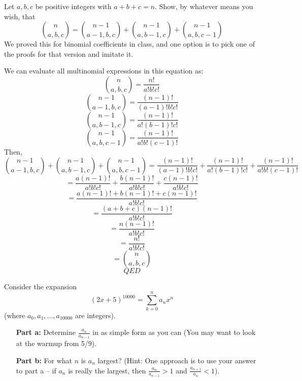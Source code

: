 \documentclass[11pt]{amsart}
\begin{document}
\begin{problem}

Let $a,b,c$ be positive integers with $a+b+c=n$.  Show, by whatever means you wish, that 
$$\binom{n}{a,b,c} = \binom{n-1}{a-1,b,c}+\binom{n-1}{a,b-1,c}+\binom{n-1}{a,b,c-1}$$
We proved this for binomial coefficients in class, and one option is to pick one of the proofs for that version and imitate it. 
\end{problem}
\begin{solution}

We can evaluate all multinomial expressions in this equation as:
$$\binom{n}{a,b,c} = \frac{n!}{a!b!c!}$$
$$\binom{n-1}{a-1,b,c} = \frac{(n-1)!}{(a-1)!b!c!}$$
$$\binom{n-1}{a,b-1,c} = \frac{(n-1)!}{a!(b-1)!c!}$$
$$\binom{n-1}{a,b,c-1} = \frac{(n-1)!}{a!b!(c-1)!}$$
Then,
$$\binom{n-1}{a-1,b,c} + \binom{n-1}{a,b-1,c} + \binom{n-1}{a,b,c-1} = \frac{(n-1)!}{(a-1)!b!c!} + \frac{(n-1)!}{a!(b-1)!c!} + \frac{(n-1)!}{a!b!(c-1)!}$$
$$= \frac{a(n-1)!}{a!b!c!} + \frac{b(n-1)!}{a!b!c!} + \frac{c(n-1)!}{a!b!c!}$$
$$= \frac{a(n-1)!+b(n-1)!+c(n-1)!}{a!b!c!}$$
$$= \frac{(a+b+c)(n-1)!}{a!b!c!}$$
$$= \frac{n(n-1)!}{a!b!c!}$$
$$= \frac{n!}{a!b!c!}$$
$$ = \binom{n}{a,b,c}$$
$$QED$$
\end{solution}
 
 
\begin{problem}

Consider the expansion 
$$(2x+5)^{10000} = \sum_{k=0}^n a_n x^n$$
(where $a_0, a_1, \dots, a_{10000}$ are integers).
\begin{itemize}
	\item[\textbf{Part a:}]{} Determine $\frac{a_n}{a_{n-1}}$ in as simple form as you can (You may want to look at the warmup from 5/9).
	\item[\textbf{Part b:}]{} For what $n$ is $a_n$ largest?  (Hint: One approach is to use your answer to part a -- if $a_n$ is really the largest, then $\frac{a_n}{a_{n-1}}>1$ and $\frac{a_{n+1}}{a_n}<1$).
\end{itemize}
\end{problem}
\begin{solution}
\end{solution}
 
\end{document}
